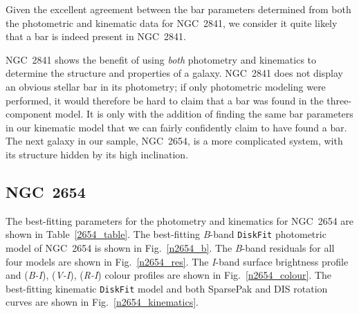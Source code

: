 \documentclass[a4paper,fleqn,usenatbib]{mnras}
\begin{document}
Given the excellent agreement between the bar parameters determined from both the photometric and kinematic data for NGC~2841, we consider it quite likely that a bar is indeed present in NGC~2841.  

NGC~2841 shows the benefit of using \textit{both} photometry and kinematics to determine the structure and properties of a galaxy. NGC~2841 does not display an obvious stellar bar in its photometry; if only photometric modeling were performed, it would therefore be hard to claim that a bar was found in the three-component model. It is only with the addition of finding the same bar parameters in our kinematic model that we can fairly confidently claim to have found a bar. The next galaxy in our sample, NGC~2654, is a more complicated system, with its structure hidden by its high inclination.

\subsection{NGC~2654}
\label{sec:n2654}

The best-fitting parameters for the photometry and kinematics for NGC~2654 are shown in Table~\ref{2654_table}. The best-fitting \textit{B}-band \texttt{DiskFit} photometric model of NGC~2654 is shown in Fig.~\ref{n2654_b}. The \textit{B}-band residuals for all four models are shown in Fig.~\ref{n2654_res}. The \textit{I}-band surface brightness profile and (\textit{B-I}), (\textit{V-I}), (\textit{R-I}) colour profiles are shown in Fig.~\ref{n2654_colour}. The best-fitting kinematic \texttt{DiskFit} model and both SparsePak and DIS rotation curves are shown in Fig.~\ref{n2654_kinematics}.
\end{document}
